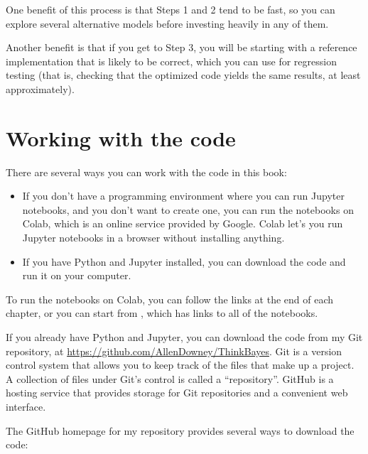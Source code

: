 \documentclass[12pt]{book}
\theoremstyle{exercise}
\begin{document}
One benefit of this process is that Steps 1 and 2 tend to be fast, so you
can explore several alternative models before investing heavily in any
of them.

Another benefit is that if you get to Step 3, you will be starting
with a reference implementation that is likely to be correct,
which you can use for regression testing (that is, checking that the
optimized code yields the same results, at least approximately).


\section{Working with the code}
\label{codeinfo}

There are several ways you can work with the code in this book:

\begin{itemize}

\item If you don't have a programming environment where you can run Jupyter notebooks, and you don't want to create one, you can run the notebooks on Colab, which is an online service provided by Google.  Colab let's you run Jupyter notebooks in a browser without installing anything.

\item If you have Python and Jupyter installed, you can download the code and run it on your computer.

\end{itemize}

To run the notebooks on Colab, you can follow the links at the end of each chapter, or you can start from \url{}, which has links to all of the notebooks.

If you already have Python and Jupyter, you can download the code from
my Git repository, at \url{https://github.com/AllenDowney/ThinkBayes}.  Git is a version control system that allows you to keep track of the files that make up a project.  
A collection of files under Git's control is
called a ``repository''.  
GitHub is a hosting service that provides storage for Git repositories and a convenient web interface.


The GitHub homepage for my repository provides several ways to download the code:
\end{document}
